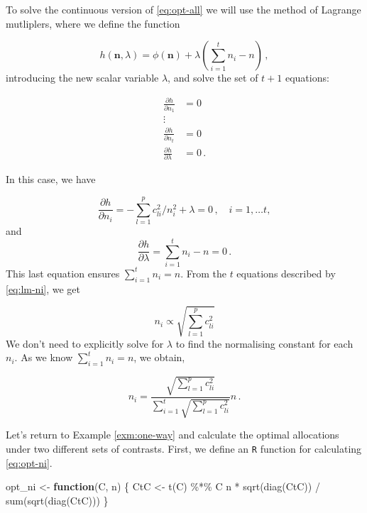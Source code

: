 \documentclass[
]{book}
\newenvironment{Shaded}{\begin{snugshade}}{\end{snugshade}}
\newcommand{\ControlFlowTok}[1]{\textcolor[rgb]{0.13,0.29,0.53}{\textbf{#1}}}
\newcommand{\FunctionTok}[1]{\textcolor[rgb]{0.00,0.00,0.00}{#1}}
\newcommand{\NormalTok}[1]{#1}
\newcommand{\OtherTok}[1]{\textcolor[rgb]{0.56,0.35,0.01}{#1}}
\newcommand{\SpecialCharTok}[1]{\textcolor[rgb]{0.00,0.00,0.00}{#1}}
\theoremstyle{definition}
\theoremstyle{definition}
\theoremstyle{definition}
\theoremstyle{definition}
\theoremstyle{remark}
\begin{document}
To solve the continuous version of \eqref{eq:opt-all} we will use the method of Lagrange mutliplers, where we define the function

\[
h(\boldsymbol{n}, \lambda) = \phi(\boldsymbol{n}) + \lambda\left(\sum_{i=1}^tn_i - n\right)\,,
\]
introducing the new scalar variable \(\lambda\), and solve the set of \(t+1\) equations:

\begin{align*}
\frac{\partial h}{\partial n_1} & = 0 \\
\vdots & \\
\frac{\partial h}{\partial n_t} & = 0 \\
\frac{\partial h}{\partial \lambda} & = 0\,.
\end{align*}

In this case, we have

\begin{equation}
\frac{\partial h}{\partial n_i} = -\sum_{l=1}^pc_{li}^2/n_i^2 + \lambda = 0\,,\quad i=1,\ldots t,
\label{eq:lm-ni}
\end{equation}
and
\[
\frac{\partial h}{\partial \lambda} = \sum_{i=1}^t n_i - n = 0\,.
\]
This last equation ensures \(\sum_{i=1}^tn_i = n\). From the \(t\) equations described by \eqref{eq:lm-ni}, we get

\[
n_i \propto \sqrt{\sum_{l=1}^pc_{li}^2}
\]
We don't need to explicitly solve for \(\lambda\) to find the normalising constant for each \(n_i\). As we know \(\sum_{i=1}^tn_i = n\), we obtain,

\begin{equation}
n_i = \frac{\sqrt{\sum_{l=1}^pc_{li}^2}}{\sum_{i=1}^t\sqrt{\sum_{l=1}^pc_{li}^2}}n\,.
\label{eq:opt-ni}
\end{equation}

Let's return to Example \ref{exm:one-way} and calculate the optimal allocations under two different sets of contrasts. First, we define an \texttt{R} function for calculating \eqref{eq:opt-ni}.

\begin{Shaded}
\begin{Highlighting}[]
\NormalTok{opt\_ni }\OtherTok{\textless{}{-}} \ControlFlowTok{function}\NormalTok{(C, n) \{}
\NormalTok{  CtC }\OtherTok{\textless{}{-}} \FunctionTok{t}\NormalTok{(C) }\SpecialCharTok{\%*\%}\NormalTok{ C}
\NormalTok{  n }\SpecialCharTok{*} \FunctionTok{sqrt}\NormalTok{(}\FunctionTok{diag}\NormalTok{(CtC)) }\SpecialCharTok{/} \FunctionTok{sum}\NormalTok{(}\FunctionTok{sqrt}\NormalTok{(}\FunctionTok{diag}\NormalTok{(CtC)))}
\NormalTok{\} }
\end{Highlighting}
\end{Shaded}
\end{document}
